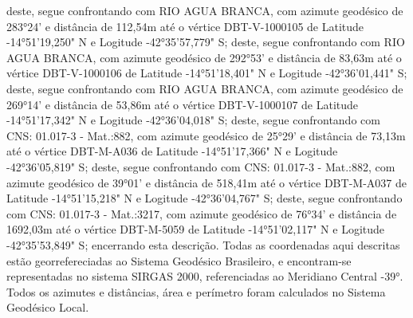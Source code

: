 deste, segue confrontando com RIO AGUA BRANCA, com azimute geodésico de 283°24' e distância de 
112,54m até o vértice DBT-V-1000105 de Latitude -14°51'19,250" N e Logitude -42°35'57,779" S;
deste, segue confrontando com RIO AGUA BRANCA, com azimute geodésico de 292°53' e distância de 
83,63m até o vértice DBT-V-1000106 de Latitude -14°51'18,401" N e Logitude -42°36'01,441" S;
deste, segue confrontando com RIO AGUA BRANCA, com azimute geodésico de 269°14' e distância de 
53,86m até o vértice DBT-V-1000107 de Latitude -14°51'17,342" N e Logitude -42°36'04,018" S;
deste, segue confrontando com CNS: 01.017-3 - Mat.:882, com azimute geodésico de 25°29' e distância de 
73,13m até o vértice DBT-M-A036 de Latitude -14°51'17,366" N e Logitude -42°36'05,819" S;
deste, segue confrontando com CNS: 01.017-3 - Mat.:882, com azimute geodésico de 39°01' e distância de 
518,41m até o vértice DBT-M-A037 de Latitude -14°51'15,218" N e Logitude -42°36'04,767" S;
deste, segue confrontando com CNS: 01.017-3 - Mat.:3217, com azimute geodésico de 76°34' e distância de 
1692,03m até o vértice DBT-M-5059 de Latitude -14°51'02,117" N e Logitude -42°35'53,849" S;
 encerrando esta descrição. Todas as coordenadas aqui descritas estão georrefereciadas ao Sistema 
Geodésico Brasileiro, e encontram-se representadas no sistema SIRGAS 2000, referenciadas ao Meridiano Central -39°.
 Todos os azimutes e distâncias, área e perímetro foram calculados no Sistema Geodésico Local.